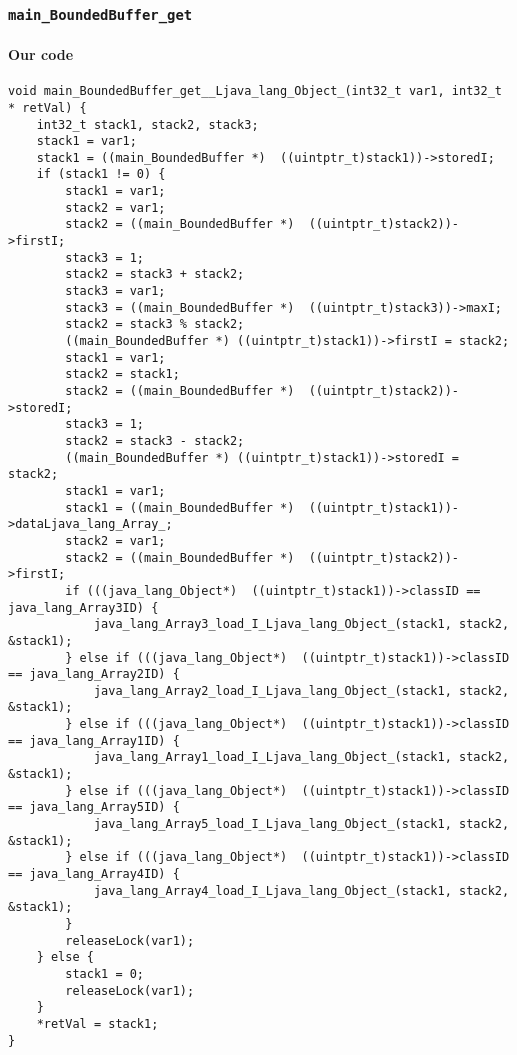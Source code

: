 \subsubsection{\texttt{main\_BoundedBuffer\_get}}

\paragraph{Our code}\hfill
\begin{lstlisting}[firstnumber=2180]
void main_BoundedBuffer_get__Ljava_lang_Object_(int32_t var1, int32_t * retVal) {
	int32_t stack1, stack2, stack3;
	stack1 = var1;
	stack1 = ((main_BoundedBuffer *)  ((uintptr_t)stack1))->storedI;
	if (stack1 != 0) {
		stack1 = var1;
		stack2 = var1;
		stack2 = ((main_BoundedBuffer *)  ((uintptr_t)stack2))->firstI;
		stack3 = 1;
		stack2 = stack3 + stack2;
		stack3 = var1;
		stack3 = ((main_BoundedBuffer *)  ((uintptr_t)stack3))->maxI;
		stack2 = stack3 % stack2;
		((main_BoundedBuffer *) ((uintptr_t)stack1))->firstI = stack2;
		stack1 = var1;
		stack2 = stack1;
		stack2 = ((main_BoundedBuffer *)  ((uintptr_t)stack2))->storedI;
		stack3 = 1;
		stack2 = stack3 - stack2;
		((main_BoundedBuffer *) ((uintptr_t)stack1))->storedI = stack2;
		stack1 = var1;
		stack1 = ((main_BoundedBuffer *)  ((uintptr_t)stack1))->dataLjava_lang_Array_;
		stack2 = var1;
		stack2 = ((main_BoundedBuffer *)  ((uintptr_t)stack2))->firstI;
		if (((java_lang_Object*)  ((uintptr_t)stack1))->classID == java_lang_Array3ID) {
			java_lang_Array3_load_I_Ljava_lang_Object_(stack1, stack2, &stack1);
		} else if (((java_lang_Object*)  ((uintptr_t)stack1))->classID == java_lang_Array2ID) {
			java_lang_Array2_load_I_Ljava_lang_Object_(stack1, stack2, &stack1);
		} else if (((java_lang_Object*)  ((uintptr_t)stack1))->classID == java_lang_Array1ID) {
			java_lang_Array1_load_I_Ljava_lang_Object_(stack1, stack2, &stack1);
		} else if (((java_lang_Object*)  ((uintptr_t)stack1))->classID == java_lang_Array5ID) {
			java_lang_Array5_load_I_Ljava_lang_Object_(stack1, stack2, &stack1);
		} else if (((java_lang_Object*)  ((uintptr_t)stack1))->classID == java_lang_Array4ID) {
			java_lang_Array4_load_I_Ljava_lang_Object_(stack1, stack2, &stack1);
		}
		releaseLock(var1);
	} else {
		stack1 = 0;
		releaseLock(var1);
	}
	*retVal = stack1;
}
\end{lstlisting}

